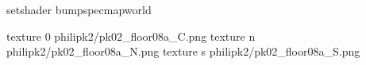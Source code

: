 setshader bumpspecmapworld

texture 0 philipk2/pk02_floor08a_C.png
texture n philipk2/pk02_floor08a_N.png
texture s philipk2/pk02_floor08a_S.png

